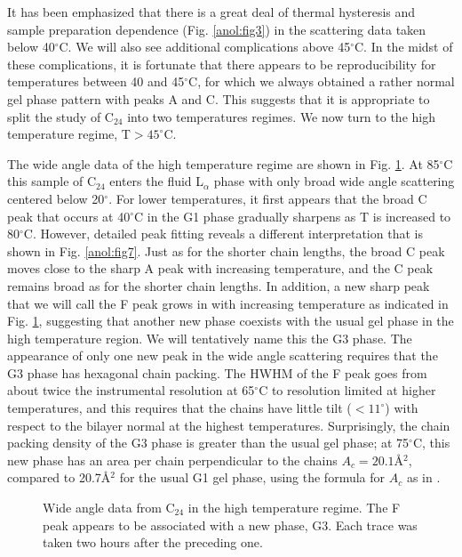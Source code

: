 It has been emphasized that there is a great deal of thermal hysteresis
and sample preparation dependence (Fig. \ref{anol:fig3}) in the scattering data
taken below 40$^{\circ}$C. We will also see additional complications above 
45$^{\circ}$C. In the midst of these complications, it is fortunate 
that there appears to be reproducibility for temperatures between 40 and 
45$^{\circ}$C, for which we always obtained a rather normal gel phase pattern 
with peaks A and C. This suggests that it is appropriate to split the study of 
C$_{24}$ into two temperatures regimes. We now turn to the high temperature 
regime, T$ > 45^{\circ}$C.  

The wide angle data of the high temperature regime are shown in 
Fig. \ref{anol:fig6}.  
At 85$^{\circ}$C this sample of C$_{24}$ enters the fluid L$_\alpha$ 
phase with only
broad wide angle scattering centered below 20$^{\circ}$.  For lower
temperatures, it first appears that the broad C peak that occurs at 
40$^{\circ}$C
in the G1 phase gradually sharpens as T is increased to 80$^{\circ}$C.
However, detailed peak fitting reveals a different interpretation 
that is shown in Fig. \ref{anol:fig7}.  Just as for the shorter chain 
lengths, the broad C
peak moves close to the sharp A peak with increasing temperature,
and the C peak remains broad as for the shorter chain lengths.
In addition, a new sharp peak that we will call the F peak grows in 
with increasing temperature as indicated in Fig. \ref{anol:fig6}, 
suggesting that another 
new phase coexists with the usual gel phase in the high temperature region.  
We will tentatively name this
the G3 phase.  The appearance of only one new peak in 
the wide angle scattering requires that the G3 phase has 
hexagonal chain packing.  The HWHM of the F peak goes from about twice
the instrumental resolution at 65$^{\circ}$C to resolution limited at
higher temperatures, and this requires that the chains have little tilt 
($< 11^{\circ}$) with respect to the
bilayer normal at the highest temperatures.
Surprisingly, the chain packing density of the G3
phase is greater than the usual gel phase; at 75$^{\circ}$C,
this new phase has an area per chain perpendicular to the chains 
$A_c = 20.1$\AA$^2$, compared to 20.7\AA$^2$ for the usual G1 gel phase,
using the formula for $A_c$ as in \cite{STN92,Sun94}.

\begin{figure}[t]
\centerline {}
\caption{Wide angle data from C$_{24}$ in the high temperature regime.
The F peak appears to be associated with a new phase, G3.
Each trace was taken two hours after the preceding one.
\label{anol:fig6}}
\end{figure}

